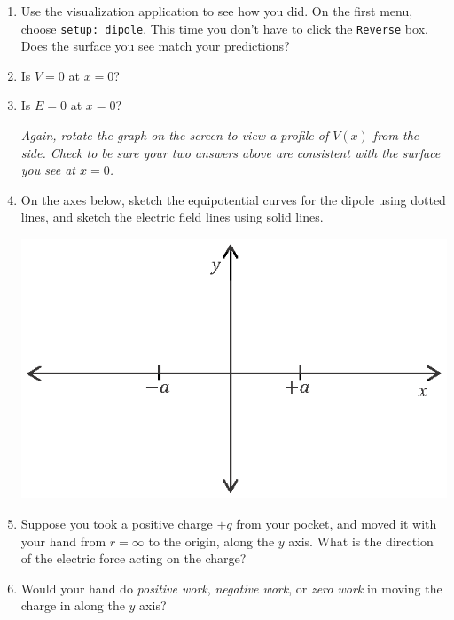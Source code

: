 \begin{enumerate}[labparts]
\item Use the visualization application to see how you did.  On the first menu, choose \verb!setup: dipole!.  This time you don't have to click the \verb!Reverse! box.  Does the surface you see match your predictions?
\answerspace{0.3in}

\item Is $V=0$ at $x=0$?
\answerspace{0.3in}

\item Is $E=0$ at $x=0$?
\answerspace{0.3in}

\textit{Again, rotate the graph on the screen to view a profile of $V(x)$ from the side.  Check to be sure your two answers above are consistent with the surface you see at $x=0$.}

\item On the axes below, sketch the equipotential curves for the dipole using dotted lines, and sketch the electric field lines using solid lines.
\begin{center}
\includegraphics{potential_superposition/activity_2_3_figs/x_y_axes.eps}
\end{center}

\item Suppose you took a positive charge $+q$ from your pocket, and moved it with your hand from $r=\infty$ to the origin, along the $y$ axis.  What is the direction of the electric force acting on the charge?
\answerspace{0.5in}

\item Would your hand do \textit{positive work}, \textit{negative work}, or \textit{zero work} in moving the charge in along the $y$ axis?
\answerspace{0.3in}
\end{enumerate}
